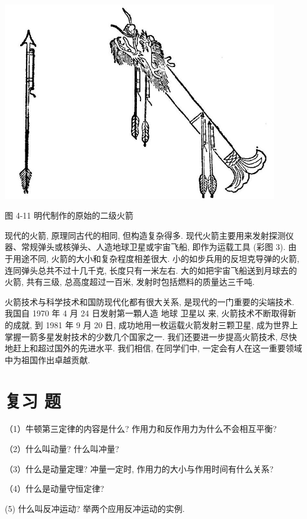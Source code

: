\documentclass[10pt]{article}
\begin{document}
\begin{center}
\includegraphics[max width=0.9\textwidth]{images/01912d55-147c-70aa-b0e0-1782a122f948_126_786232.jpg}
\end{center}

图 4-11 明代制作的原始的二级火箭

现代的火箭, 原理同古代的相同, 但构造复杂得多. 现代火箭主要用来发射探测仪器、常规弹头或核弹头、人造地球卫星或宇宙飞船, 即作为运载工具 (彩图 3). 由于用途不同, 火箭的大小和复杂程度相差很大. 小的如步兵用的反坦克导弹的火箭, 连同弹头总共不过十几千克, 长度只有一米左右. 大的如把宇宙飞船送到月球去的火箭, 共有三级, 总高度超过一百米, 发射时包括燃料的质量达三千吨.

火箭技术与科学技术和国防现代化都有很大关系, 是现代的一门重要的尖端技术. 我国自 1970 年 4 月 24 日发射第一顆人造 地球 卫星以 来, 火箭技术不断取得新的成就, 到 1981 年 9 月 20 日, 成功地用一枚运载火箭发射三颗卫星, 成为世界上掌握一箭多星发射技术的少数几个国家之一. 我们还要进一步提高火箭技术, 尽快地赶上和超过国外的先进水平. 我们相信, 在同学们中, 一定会有人在这一重要领域中为祖国作出卓越贡献.

\section*{复习 题}

（1）牛顿第三定律的内容是什么? 作用力和反作用力为什么不会相互平衡?

（2）什么叫动量? 什么叫冲量?

（3）什么是动量定理? 冲量一定时, 作用力的大小与作用时间有什么关系?

（4）什么是动量守恒定律?

(5) 什么叫反冲运动? 举两个应用反冲运动的实例.
\end{document}
